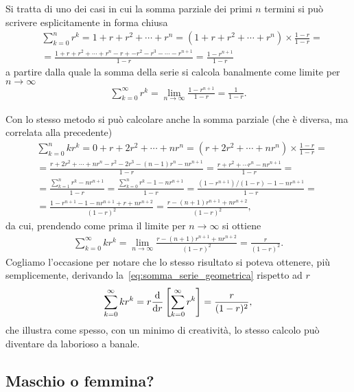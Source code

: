 Si tratta di uno dei casi in cui la somma parziale dei primi $n$ termini
si può scrivere esplicitamente in forma chiusa
\begin{align*}
  & \sum_{k = 0}^n r^k = 1 + r + r^2 + \cdots + r^n =
  (1 + r + r^2 + \cdots + r^n) \times \frac{1 - r}{1 - r} =\\
  & = \frac{1 + r + r^2 + \cdots + r^n - r + -r^2 - r^3 - \cdots - r^{n+1}}{1 - r}
  = \frac{1 - r^{n+1}}{1-r}
\end{align*}
a partire dalla quale la somma della serie si calcola banalmente come
limite per $n\rightarrow\infty$
\begin{align}\label{eq:somma_serie_geometrica}
  \sum_{k = 0}^{\infty} r^k = \lim_{n\rightarrow\infty} \frac{1 - r^{n+1}}{1 - r} =
  \frac{1}{1 - r}.
\end{align}

Con lo stesso metodo si può calcolare anche la somma parziale
(che è diversa, ma correlata alla precedente)
\begin{align*}
  & \sum_{k = 0}^{n} kr^k = 0 + r + 2r^2 + \cdots + nr^n =
  (r + 2r^2 + \cdots + nr^n) \times \frac{1 - r}{1 - r} =\\
  & = \frac{r + 2r^2 + \cdots + nr^n - r^2 - 2r^3 - (n -1)r^n - nr^{n+1}}{1 - r} =
  \frac{r + r^2 + \cdots r^n - nr^{n+1}}{1 - r} =\\
  & = \frac{\sum_{k = 1}^n r^k - nr^{n+1}}{1 - r} =
  \frac{\sum_{k = 0}^n r^k - 1 - nr^{n+1}}{1 - r} =
  \frac{(1 - r^{n+1})/(1 - r) - 1 - nr^{n+1}}{1 - r} =\\
  & = \frac{1 - r^{n+1} - 1 - nr^{n+1} + r + nr^{n+2}}{(1 - r)^2} =
  \frac{r - (n + 1)r^{n+1} + nr^{n+2}}{(1 - r)^2},
\end{align*}
da cui, prendendo come prima il limite per $n\rightarrow\infty$ si ottiene
\begin{align}
  \sum_{k = 0}^{\infty} kr^k =
  \lim_{n\rightarrow\infty} \frac{r - (n + 1)r^{n+1} + nr^{n+2}}{(1 - r)^2} =
  \frac{r}{(1 - r)^2}.
\end{align}
Cogliamo l'occasione per notare che lo stesso risultato si poteva ottenere,
più semplicemente, derivando la~\eqref{eq:somma_serie_geometrica} rispetto ad
$r$
\begin{align*}
  \sum_{k = 0}^{\infty} kr^k = r\td{}{r}{} \left[ \sum_{k = 0}^{\infty} r^k \right] =
  \frac{r}{(1 - r)^2},
\end{align*}
che illustra come spesso, con un minimo di creatività, lo stesso calcolo può
diventare da laborioso a banale.


\subsection{Maschio o femmina?}


